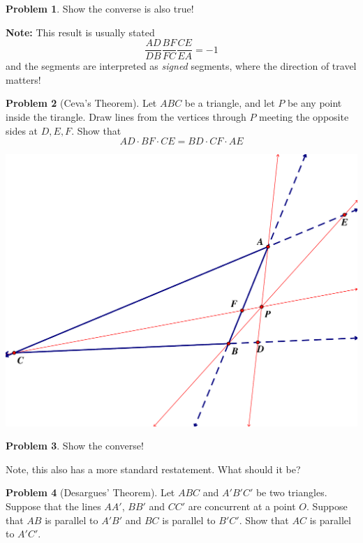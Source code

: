 \documentclass{tufte-handout}
\theoremstyle{definition}
\newtheorem{problem}{Problem}[section]
\begin{document}
\begin{problem}
Show the converse is also true!
\end{problem}

\noindent\textbf{Note:} This result is usually stated
\[ 
\dfrac{AD}{DB}\dfrac{BF}{FC}\dfrac{CE}{EA} = -1
\]
and the segments are interpreted as \emph{signed} segments, where the direction of travel matters!

\begin{problem}[Ceva's Theorem] \label{prob:Ceva-theorem}
Let $ABC$ be a triangle, and let $P$ be any point inside the tirangle. Draw lines from the vertices through $P$ meeting the opposite sides at $D, E, F$. Show that 
\[ AD\cdot BF\cdot CE = BD \cdot CF \cdot AE \]
\end{problem}

\begin{center}
\includegraphics[scale=.25]{Ceva.pdf}
\end{center}

\begin{problem}
Show the converse!
\end{problem}

Note, this also has a more standard restatement. What should it be?


\begin{problem}[Desargues' Theorem]\label{prob:Desargue's-special-case}
Let $ABC$ and $A'B'C'$ be two triangles. Suppose that the lines $AA'$, $BB'$ and $CC'$ are concurrent at a point $O$. Suppose that $AB$ is parallel to $A'B'$ and $BC$ is parallel to $B'C'$. Show that $AC$ is parallel to $A'C'$.
\end{problem}



\vfill
\end{document}
